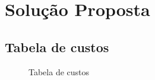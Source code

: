 \chapter[Solução Proposta]{Solução Proposta}







\section{Tabela de custos}

 \begin{figure}[H]
 	\begin{center}
 	\end{center}
 \end{figure}
 
 \begin{figure}[H]
 	\begin{center}
 		\caption{Tabela de custos}
 	\end{center}
 \end{figure}
